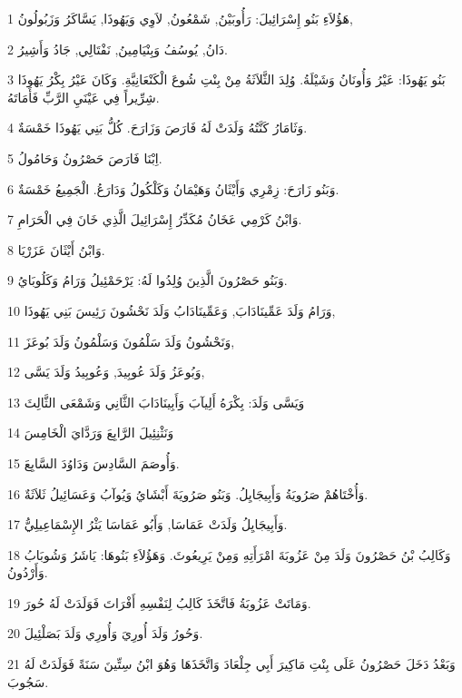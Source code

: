 \par 1 هَؤُلاَءِ بَنُو إِسْرَائِيلَ: رَأُوبَيْنُ, شَمْعُونُ, لاَوِي وَيَهُوذَا, يَسَّاكَرُ وَزَبُولُونُ,
\par 2 دَانُ, يُوسُفُ وَبِنْيَامِينُ, نَفْتَالِي, جَادُ وَأَشِيرُ.
\par 3 بَنُو يَهُوذَا: عَيْرُ وَأُونَانُ وَشَيْلَةُ. وُلِدَ الثَّلاَثَةُ مِنْ بِنْتِ شُوعَ الْكَنْعَانِيَّةِ. وَكَانَ عَيْرُ بِكْرُ يَهُوذَا شِرِّيراً فِي عَيْنَيِ الرَّبِّ فَأَمَاتَهُ.
\par 4 وَثَامَارُ كَنَّتُهُ وَلَدَتْ لَهُ فَارَصَ وَزَارَحَ. كُلُّ بَنِي يَهُوذَا خَمْسَةٌ.
\par 5 اِبْنَا فَارَصَ حَصْرُونُ وَحَامُولُ.
\par 6 وَبَنُو زَارَحَ: زِمْرِي وَأَيْثَانُ وَهَيْمَانُ وَكَلْكُولُ وَدَارَعُ. الْجَمِيعُ خَمْسَةٌ.
\par 7 وَابْنُ كَرْمِي عَخَانُ مُكَدِّرُ إِسْرَائِيلَ الَّذِي خَانَ فِي الْحَرَامِ.
\par 8 وَابْنُ أَيْثَانَ عَزَرْيَا.
\par 9 وَبَنُو حَصْرُونَ الَّذِينَ وُلِدُوا لَهُ: يَرْحَمْئِيلُ وَرَامُ وَكَلُوبَايُ.
\par 10 وَرَامُ وَلَدَ عَمِّينَادَابَ, وَعَمِّينَادَابُ وَلَدَ نَحْشُونَ رَئِيسَ بَنِي يَهُوذَا,
\par 11 وَنَحْشُونُ وَلَدَ سَلْمُونَ وَسَلْمُونُ وَلَدَ بُوعَزَ,
\par 12 وَبُوعَزُ وَلَدَ عُوبِيدَ, وَعُوبِيدُ وَلَدَ يَسَّى,
\par 13 وَيَسَّى وَلَدَ: بِكْرَهُ أَلِيآبَ وَأَبِينَادَابَ الثَّانِي وَشَمْعَى الثَّالِثَ
\par 14 وَنَثْنِئِيلَ الرَّابِعَ وَرَدَّايَ الْخَامِسَ
\par 15 وَأُوصَمَ السَّادِسَ وَدَاوُدَ السَّابِعَ.
\par 16 وَأُخْتَاهُمْ صَرُويَةُ وَأَبِيجَايِلُ. وَبَنُو صَرُويَةَ أَبْشَايُ وَيُوآبُ وَعَسَائِيلُ ثَلاَثَةٌ.
\par 17 وَأَبِيجَايِلُ وَلَدَتْ عَمَاسَا, وَأَبُو عَمَاسَا يَثْرُ الإِسْمَاعِيلِيُّ.
\par 18 وَكَالِبُ بْنُ حَصْرُونَ وَلَدَ مِنْ عَزُوبَةَ امْرَأَتِهِ وَمِنْ يَرِيعُوثَ. وَهَؤُلاَءِ بَنُوهَا: يَاشَرُ وَشُوبَابُ وَأَرْدُونُ.
\par 19 وَمَاتَتْ عَزُوبَةُ فَاتَّخَذَ كَالِبُ لِنَفْسِهِ أَفْرَاتَ فَوَلَدَتْ لَهُ حُورَ.
\par 20 وَحُورُ وَلَدَ أُورِيَ وَأُورِي وَلَدَ بَصَلْئِيلَ.
\par 21 وَبَعْدُ دَخَلَ حَصْرُونُ عَلَى بِنْتِ مَاكِيرَ أَبِي جِلْعَادَ وَاتَّخَذَهَا وَهُوَ ابْنُ سِتِّينَ سَنَةً فَوَلَدَتْ لَهُ سَجُوبَ.

